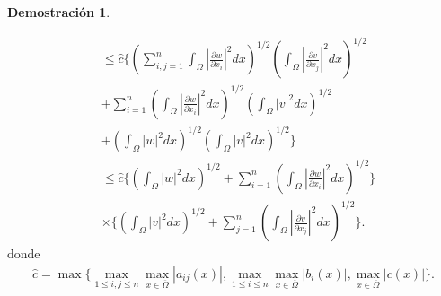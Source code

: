 \documentclass[a4paper,11pt,spanish, twoside, leqno]{tfg-uam}
\theoremstyle{definition}
\newtheorem{dem}[teor]{Demostración}
\begin{document}
\begin{dem}
\begin{itemize}
\begin{align*}
            &\leq \hat{c} \Bigg\{
            \left( \sum_{i,j=1}^n \int_\Omega \left| \frac{\partial w}{\partial x_i} \right|^2 dx \right)^{1/2}
            \left( \int_\Omega \left| \frac{\partial v}{\partial x_j} \right|^2 dx \right)^{1/2}\\
            &+ \sum_{i=1}^n \left( \int_\Omega \left| \frac{\partial w}{\partial x_i} \right|^2 dx \right)^{1/2}
            \left( \int_\Omega |v|^2 dx \right)^{1/2} \\
            &+ \left( \int_\Omega |w|^2 dx \right)^{1/2}
            \left( \int_\Omega |v|^2 dx \right)^{1/2}
            \Bigg\}\\
            &\leq \hat{c} \Bigg\{
            \left( \int_\Omega |w|^2 dx \right)^{1/2}
            + \sum_{i=1}^n \left( \int_\Omega \left| \frac{\partial w}{\partial x_i} \right|^2 dx \right)^{1/2}
            \Bigg\} \\
            &\times
            \Bigg\{
            \left( \int_\Omega |v|^2 dx \right)^{1/2}
            + \sum_{j=1}^n \left( \int_\Omega \left| \frac{\partial v}{\partial x_j} \right|^2 dx \right)^{1/2}
            \Bigg\}.
        \end{align*}
        donde
        \begin{align*}
            \hat{c} = \max \Bigg\{ \max_{1 \leq i,j \leq n} \max_{x \in \overline{\Omega}} |a_{ij}(x)|, \max_{1 \leq i \leq n} \max_{x \in \overline{\Omega}} |b_i(x)|, \max_{x \in \overline{\Omega}} |c(x)| \Bigg\}.
        \end{align*}


\end{itemize}
\end{dem}
\end{document}
